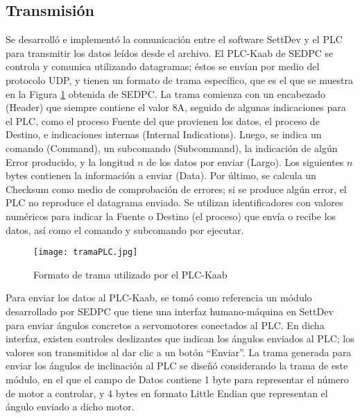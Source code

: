 \subsection{Transmisión}

Se desarrolló e implementó la comunicación entre el software SettDev y el PLC para transmitir los datos leídos desde el archivo. El PLC-Kaab de SEDPC se controla y comunica utilizando datagramas; éstos se envían por medio del protocolo UDP, y tienen un formato de trama específico, que es el que se muestra en la Figura \ref{fig:tramaPLC} obtenida de SEDPC. La trama comienza con un encabezado (Header) que siempre contiene el valor 8A, seguido de algunas indicaciones para el PLC, como el proceso Fuente del que provienen los datos, el proceso de Destino, e indicaciones internas (Internal Indications). Luego, se indica un comando (Command), un subcomando (Subcommand), la indicación de algún Error producido, y la longitud $n$ de los datos por enviar (Largo). Los siguientes $n$ bytes contienen la información a enviar (Data). Por último, se calcula un Checksum como medio de comprobación de errores; si se produce algún error, el PLC no reproduce el datagrama enviado. Se utilizan identificadores con valores numéricos para indicar la Fuente o Destino (el proceso) que envía o recibe los datos, así como el comando y subcomando por ejecutar.

\begin{figure}[htb]
	\centering
	\texttt{[image: tramaPLC.jpg]}
	\caption{Formato de trama utilizado por el PLC-Kaab}
	\label{fig:tramaPLC}
\end{figure}

Para enviar los datos al PLC-Kaab, se tomó como referencia  un módulo desarrollado por SEDPC que tiene una interfaz humano-máquina en SettDev para enviar ángulos concretos a servomotores conectados al PLC. En dicha interfaz, existen controles deslizantes que indican los ángulos enviados al PLC; los valores son transmitidos al dar clic a un botón ``Enviar''. La trama generada para enviar los ángulos de inclinación al PLC se diseñó considerando la trama de este módulo, en el que el campo de Datos contiene 1 byte para representar el número de motor a controlar, y 4 bytes en formato Little Endian que representan el ángulo enviado a dicho motor.